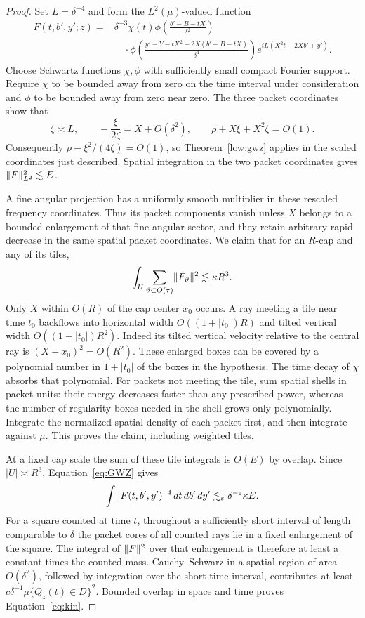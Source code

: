 \begin{proof}
Set $L=\delta^{-4}$ and form the $L^2(\mu)$-valued function
\[
\begin{split}
 F(t,b',y';z)={}&\delta^{-3}\chi(t)
 \phi\left(\frac{b'-B-tX}{\delta^2}\right)\\
 &\quad\cdot
 \phi\left(\frac{y'-Y-tX^2-2X(b'-B-tX)}{\delta^4}\right)
 e^{iL(X^2t-2Xb'+y')}.
\end{split}
\]
Choose Schwartz functions $\chi,\phi$ with sufficiently small compact
Fourier support. Require $\chi$ to be bounded away from zero on the time
interval under consideration and $\phi$ to be bounded away from zero
near zero. The three packet coordinates show that
\[
 \zeta\asymp L,\qquad -\frac{\xi}{2\zeta}=X+O(\delta^2),\qquad
 \rho+X\xi+X^2\zeta=O(1).
\]
Consequently
$\rho-\xi^2/(4\zeta)=O(1)$, so Theorem~\ref{low:gwz} applies in the
scaled coordinates just described. Spatial integration in the two packet
coordinates gives $\lVert F\rVert_{L^2}^2\lesssim E$.

A fine angular projection has a uniformly smooth multiplier in these
rescaled frequency coordinates. Thus its packet components vanish unless
$X$ belongs to a bounded enlargement of that fine angular sector, and
they retain arbitrary rapid decrease in the same spatial packet
coordinates. We claim that for an $R$-cap and any of its tiles,
\[
 \int_U\sum_{\vartheta\subset O(\tau)}
             \lVert F_\vartheta\rVert^2\lesssim\kappa R^3.
\]
Only $X$ within $O(R)$ of the cap center $x_0$ occurs. A ray meeting a tile
near time $t_0$ backflows into horizontal width $O((1+|t_0|)R)$ and
tilted vertical width $O((1+|t_0|)R^2)$. Indeed its tilted vertical velocity
relative to the central ray is $(X-x_0)^2=O(R^2)$. These enlarged boxes
can be covered by a polynomial number in $1+|t_0|$ of the boxes in the
hypothesis. The time decay of $\chi$ absorbs that polynomial. For packets
not meeting the tile, sum spatial shells in packet units: their energy
decreases faster than any prescribed power, whereas the number of
regularity boxes needed in the shell grows only polynomially. Integrate
the normalized spatial density of each packet first, and then integrate
against $\mu$. This proves the claim, including weighted tiles.

At a fixed cap scale the sum of these tile integrals is $O(E)$ by overlap.
Since $|U|\asymp R^3$, Equation~\eqref{eq:GWZ} gives
\[
 \int\lVert F(t,b',y')\rVert^4\,dt\,db'\,dy'
 \lesssim_{\varepsilon}\delta^{-\varepsilon}\kappa E.
\]
For a square counted at time $t$, throughout a sufficiently short interval
of length comparable to $\delta$ the packet cores of all counted rays
lie in a fixed enlargement of the square. The integral of $\lVert F\rVert^2$
over that enlargement is therefore at least a constant times the counted
mass. Cauchy--Schwarz in a spatial region of area $O(\delta^2)$, followed
by integration over the short time interval, contributes at least
$c\delta^{-1}\mu\{Q_z(t)\in D\}^2$. Bounded overlap in space and time
proves Equation~\eqref{eq:kin}.
\end{proof}

